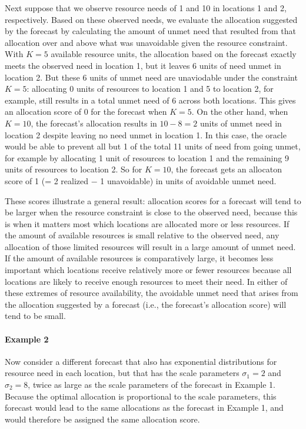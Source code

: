 \documentclass{article}\usepackage[]{graphicx}\usepackage[]{xcolor}
\begin{document}
Next suppose that we observe resource needs of 1 and 10 in locations 1 and 2, respectively. Based on these observed
needs, we evaluate the allocation suggested by the forecast by calculating the amount of unmet need
that resulted from that allocation over and above what was unavoidable given the resource constraint. With $K = 5$ 
available resource units, the allocation based on the forecast exactly meets the observed need in location 1, but it leaves 6
units of need unmet in location 2. But these 6 units of unmet need are unaviodable under the constraint $K=5$: allocating 0 units of resources to location 1 and 5 to location 2, for example, still results in a total unmet
need of 6 across both locations. This gives an allocation score of 0 for the forecast when $K = 5$. On the other hand, when
$K = 10$, the forecast's allocation results in $10 - 8 = 2$ units of unmet need in location 2 despite leaving no need
unmet in location 1. In this case, the oracle would be able to prevent all but 1 of the total 11 units of need from
going unmet, for example by allocating 1 unit of resources to location 1 and the remaining 9 units of resources to
location 2. So for $K = 10$, the forecast gets an allocaton score of 1 (= 2 realized $-$ 1 unavoidable) in
units of avoidable unmet need.

These scores illustrate a general result: allocation scores for a forecast will tend to be larger when the resource
constraint is close to the observed need, because this is when it matters most which locations are allocated more or
less resources. If the amount of available resources is small relative to the observed need, any allocation of those
limited resources will result in a large amount of unmet need. If the amount of available resources is comparatively
large, it becomes less important which locations receive relatively more or fewer resources because all locations are
likely to
receive enough resources to meet their need. In either of these extremes of resource availability, the avoidable unmet
need that arises from the allocation suggested by a forecast (i.e., the forecast's allocation score) will tend to be
small.

\paragraph{Example 2} Now consider a different forecast that also has exponential distributions for resource need in
each location, but that has the scale parameters $\sigma_1 = 2$ and $\sigma_2 = 8$, twice as large as the scale
parameters of the forecast in Example 1. Because the optimal allocation is proportional to the scale parameters, this
forecast would lead to the same allocations as the forecast in Example 1, and would therefore be assigned the same
allocation score.
\end{document}
